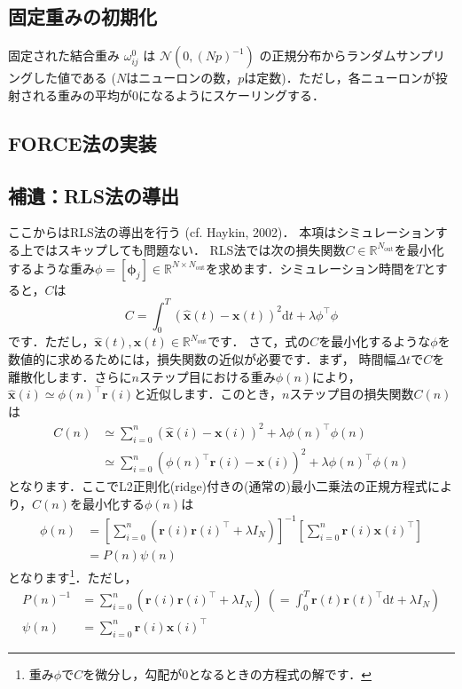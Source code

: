 \subsection{固定重みの初期化}
固定された結合重み $\omega_{i j}^{0}$ は $\mathcal{N}(0, (Np)^{-1})$ の正規分布からランダムサンプリングした値である ($N$はニューロンの数，$p$は定数)．ただし，各ニューロンが投射される重みの平均が0になるようにスケーリングする．
\subsection{FORCE法の実装}
\subsection{補遺：RLS法の導出}
ここからはRLS法の導出を行う (cf. Haykin, 2002)．
本項はシミュレーションする上ではスキップしても問題ない．
RLS法では次の損失関数$C\in \mathbb{R}^{N_\text{out}}$を最小化するような重み$\phi=[\boldsymbol{\phi}_j]\in \mathbb{R}^{N\times N_\text{out}}$を求めます．シミュレーション時間を$T$とすると，$C$は
\begin{equation}
C=\int_{0}^T(\hat{\boldsymbol{x}}(t)-\boldsymbol{x}(t))^{2} \mathrm{d} t+\lambda \phi^\top \phi
\end{equation}
です．ただし，$\hat{\boldsymbol{x}}(t), \boldsymbol{x}(t) \in \mathbb{R}^{N_\text{out}}$です．
さて，式の$C$を最小化するような$\phi$を数値的に求めるためには，損失関数の近似が必要です．まず，
時間幅$\Delta t$で$C$を離散化します．さらに$n$ステップ目における重み$\phi(n)$により，$\hat{\boldsymbol{x}}(i)\simeq \phi(n)^\top \boldsymbol{r}(i)$と近似します．このとき，$n$ステップ目の損失関数$C(n)$は
\begin{align}
C(n)&\simeq \sum_{i=0}^{n}(\hat{\boldsymbol{x}}(i)-\boldsymbol{x}(i))^{2}+\lambda \phi(n)^\top \phi(n)\\     
&\simeq \sum_{i=0}^{n}(\phi(n)^\top \boldsymbol{r}(i)-\boldsymbol{x}(i))^{2}+\lambda \phi(n)^\top \phi(n)
\end{align}
となります．ここでL2正則化(ridge)付きの(通常の)最小二乗法の正規方程式により，$C(n)$を最小化する$\phi(n)$は
\begin{align}
\phi(n) &= \left[\sum_{i=0}^{n}(\boldsymbol{r}(i)\boldsymbol{r}(i)^\top+\lambda I_N)\right]^{-1}\left[\sum_{i=0}^{n}\boldsymbol{r}(i)\boldsymbol{x}(i)^\top\right]\\
&=P(n)\psi(n)
\end{align}
となります\footnote{重み$\phi$で$C$を微分し，勾配が0となるときの方程式の解です．}．ただし，
\begin{align}
P(n)^{-1}&= \sum_{i=0}^{n}(\boldsymbol{r}(i)\boldsymbol{r}(i)^\top+\lambda I_N)\ \left(=\int_{0}^T \boldsymbol{r}(t) \boldsymbol{r}(t)^\top \mathrm{d} t+\lambda I_{N}\right)\\
\psi(n)&=\sum_{i=0}^{n}\boldsymbol{r}(i)\boldsymbol{x}(i)^\top
\end{align}
